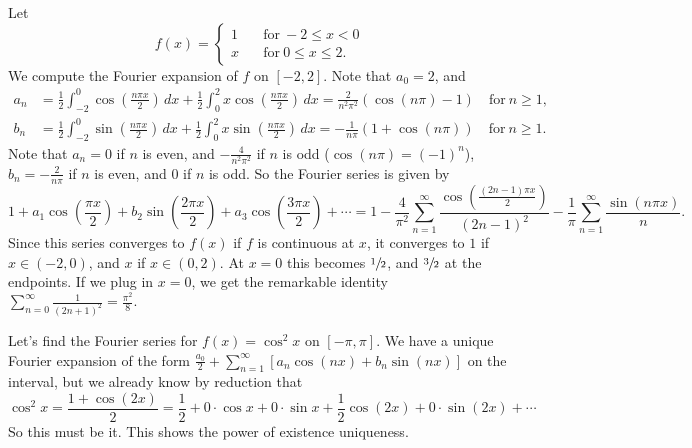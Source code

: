 \begin{example}
    Let \[
        f(x)=
        \begin{cases}
            1\quad & \text{for} \ -2\leq x <0\\
            x & \text{for} \ 0\leq x\leq 2.
        \end{cases}
    \] We compute the Fourier expansion of $f$ on $[-2,2]$. Note that $a_0=2$, and 
    \begin{align*}
        a_n  &= \frac{1}{2}\int_{-2}^{0} \cos \left( \frac{n\pi x}{2} \right) \, dx+\frac{1}{2}\int_{0}^{2} x \cos \left( \frac{n\pi x}{2} \right)  \, dx =\frac{2}{n^2\pi^2}(\cos (n\pi)-1) \quad \text{for} \ n\geq 1,\\
        b_n  &= \frac{1}{2} \int_{-2}^{0} \sin \left( \frac{n\pi x}{2} \right)  \, dx + \frac{1}{2}\int_{0}^{2} x \sin \left( \frac{n\pi x}{2} \right)  \, dx=-\frac{1}{n\pi}(1+\cos (n\pi ))\quad \text{for} \ n\geq 1.
    \end{align*}Note that $a_n =0$ if $n$ is even, and $-\frac{4}{n^2\pi^2}$ if $n$ is odd ($\cos (n\pi)=(-1)^n $), $b_n =-\frac{2}{n\pi}$ if $n$ is even, and $0$ if $n$ is odd. So the Fourier series is given by \[
    1+a_1 \cos \left( \frac{\pi x}{2} \right) + b_2 \sin \left( \frac{2 \pi x}{2} \right) + a_3 \cos \left( \frac{3\pi x}{2} \right) +\cdots =1- \frac{4}{\pi^2}\sum_{n=1}^{\infty} \frac{\cos \left( \frac{(2n-1)\pi x}{2} \right) }{(2n-1)^2}-\frac{1}{\pi }\sum_{n=1}^{\infty} \frac{\sin (n\pi x)}{n}.
    \] Since this series converges to $f(x)$ if $f$ is continuous at $x$, it converges to $1$ if $x\in (-2,0)$, and $x$ if $x\in (0,2)$. At $x=0$ this becomes $\sfrac{1}{2}$, and $\sfrac{3}{2}$ at the endpoints. If we plug in $x=0$, we get the remarkable identity $\sum_{n=0}^{\infty} \frac{1}{(2n+1)^2}=\frac{\pi^2}{8}.$
\end{example}
\begin{example}
    Let's find the Fourier series for $f(x)=\cos ^2x$ on $[-\pi, \pi]$. We have a unique Fourier expansion of the form $\frac{a_0}{2}+\sum_{n=1}^{\infty} [a_n \cos (n x)+ b_n \sin(nx)]$ on the interval, but we already know by reduction that \[
        \cos ^2 x= \frac{1+ \cos (2x)}{2}=\frac{1}{2}+ 0\cdot \cos x+ 0 \cdot \sin x + \frac{1}{2}\cos (2x) + 0 \cdot  \sin(2x)+\cdots 
    \] So this must be it. This shows the power of existence uniqueness.
\end{example}

